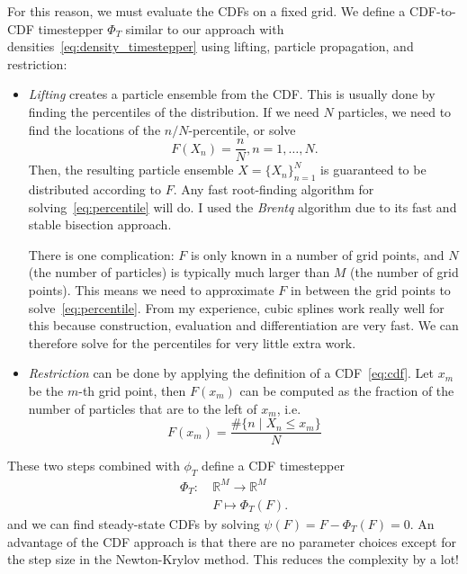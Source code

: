 \documentclass{article}
\begin{document}
For this reason, we must evaluate the CDFs on a fixed grid. We define a CDF-to-CDF timestepper $\Phi_T$ similar to our approach with densities~\eqref{eq:density_timestepper} using lifting, particle propagation, and restriction:
\begin{itemize}
    \item[] \textit{Lifting} creates a particle ensemble from the CDF. This is usually done by finding the percentiles of the distribution. If we need $N$ particles, we need to find the locations of the $n / N$-percentile, or solve
    \begin{equation} \label{eq:percentile}
        F(X_n) = \frac{n}{N}, n = 1, \dots, N.
    \end{equation}
    Then, the resulting particle ensemble $X = \{X_n\}_{n=1}^N$ is guaranteed to be distributed according to $F$. Any fast root-finding algorithm for solving~\eqref{eq:percentile} will do. I used the \textit{Brentq} algorithm due to its fast and stable bisection approach. 
    
    There is one complication: $F$ is only known in a number of grid points, and $N$ (the number of particles) is typically much larger than $M$ (the number of grid points). This means we need to approximate $F$ in between the grid points to solve~\eqref{eq:percentile}. From my experience, cubic splines work really well for this because construction, evaluation and differentiation are very fast. We can therefore solve for the percentiles for very little extra work.

    \item[] \textit{Restriction} can be done by applying the definition of a CDF~\eqref{eq:cdf}. Let $x_m$ be the $m$-th grid point, then $F(x_m)$ can be computed as the fraction of the number of particles that are to the left of $x_m$, i.e.
    \begin{equation}
        F(x_m) = \frac{\#\{n \mid X_n \leq x_m\}}{N}
    \end{equation}
\end{itemize}
These two steps combined with $\phi_T$ define a CDF timestepper
\begin{align} \label{eq:cdf_to_cdf}
    \Phi_T: \ &\mathbb{R}^M \to \mathbb{R}^M \\
    &F \mapsto \Phi_T(F).
\end{align}
and we can find steady-state CDFs by solving $\psi(F) = F - \Phi_T(F) = 0$. An advantage of the CDF approach is that there are no parameter choices except for the step size in the Newton-Krylov method. This reduces the complexity by a lot!
\end{document}
